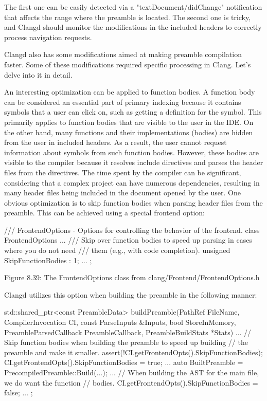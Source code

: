 The first one can be easily detected via a "textDocument/didChange" notification that affects the range where the preamble is located. The second one is tricky, and Clangd should monitor the modifications in the included headers to correctly process navigation requests.

Clangd also has some modifications aimed at making preamble compilation faster. Some of these modifications required specific processing in Clang. Let's delve into it in detail.


An interesting optimization can be applied to function bodies. A function body can be considered an essential part of primary indexing because it contains symbols that a user can click on, such as getting a definition for the symbol. This primarily applies to function bodies that are visible to the user in the IDE. On the other hand, many functions and their implementations (bodies) are hidden from the user in included headers. As a result, the user cannot request information about symbols from such function bodies. However, these bodies are visible to the compiler because it resolves include directives and parses the header files from the directives. The time spent by the compiler can be significant, considering that a complex project can have numerous dependencies, resulting in many header files being included in the document opened by the user. One obvious optimization is to skip function bodies when parsing header files from the preamble. This can be achieved using a special frontend option:

\begin{cpp}
/// FrontendOptions - Options for controlling the behavior of the frontend.
class FrontendOptions {
  ...
  /// Skip over function bodies to speed up parsing in cases where you do not need
  /// them (e.g., with code completion).
  unsigned SkipFunctionBodies : 1;
  ...
};
\end{cpp}

\begin{center}
Figure 8.39: The FrontendOptions class from clang/Frontend/FrontendOptions.h
\end{center}

Clangd utilizes this option when building the preamble in the following manner:

\begin{cpp}
std::shared_ptr<const PreambleData>
buildPreamble(PathRef FileName, CompilerInvocation CI,
              const ParseInputs &Inputs, bool StoreInMemory,
              PreambleParsedCallback PreambleCallback,
              PreambleBuildStats *Stats) {
  ...
  // Skip function bodies when building the preamble to speed up building
  // the preamble and make it smaller.
  assert(!CI.getFrontendOpts().SkipFunctionBodies);
  CI.getFrontendOpts().SkipFunctionBodies = true;
  ...
  auto BuiltPreamble = PrecompiledPreamble::Build(...);
  ...
  // When building the AST for the main file, we do want the function
  // bodies.
  CI.getFrontendOpts().SkipFunctionBodies = false;
  ...
};
\end{cpp}

